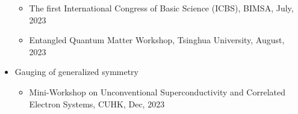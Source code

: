 \documentclass[hidelinks,a4paper]{article}
\begin{document}
\begin{itemize}
\begin{itemize}
     \item  The first International Congress of Basic Science (ICBS), BIMSA, July, 2023
     \item  Entangled Quantum Matter Workshop, Tsinghua University, August, 2023
  \end{itemize}
  \item Gauging of generalized symmetry~\supercite{LYW2312.15958}
  \begin{itemize}\small
    \item  Mini-Workshop on Unconventional Superconductivity and Correlated Electron Systems, CUHK, Dec, 2023
  \end{itemize}
  
\end{itemize}

\printbibliography[title=Publications]


    

\end{document}
